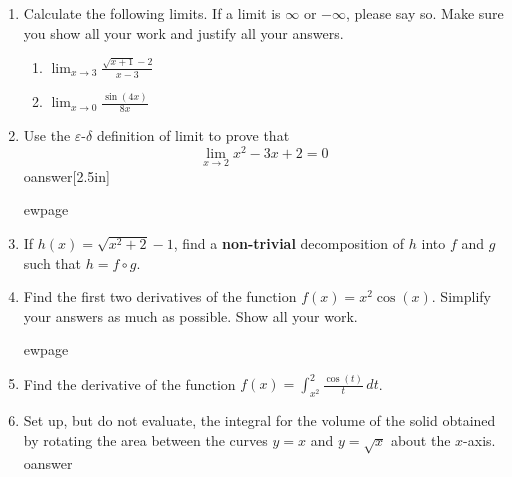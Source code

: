 \documentclass[fleqn]{article}
\let\ds\displaystyle
\begin{document}
\ExamNameLine
\begin{enumerate}
   \item Calculate the following limits.  If a limit is $\infty$ or $-\infty$,
      please say so.  Make sure you show all your work and justify all your
      answers.  
      \begin{enumerate}
	 \item $\ds{\lim_{x\rightarrow3}\frac{\sqrt{x+1} - 2}{x-3}}$\answer
	 \item $\ds{\lim_{x\rightarrow0}\frac{\sin(4x)}{8x}}$\answer
      \end{enumerate}
   \item Use the $\varepsilon$-$\delta$ definition of limit to prove that 
      \[\lim_{x\rightarrow 2} x^2 - 3x + 2 = 0\]
oanswer[2.5in]
      
ewpage
   \item If $h(x) = \sqrt{x^2 + 2} - 1$, find a \textbf{non-trivial} decomposition of $h$ into $f$ and $g$ such that $h = f\circ g$.
   \item Find the first two derivatives of the function $f(x) = x^2\cos(x)$.  Simplify
      your answers as much as possible.  Show all your work.
      
ewpage
   \item Find the derivative of the function $\ds{f(x) = \int_{x^2}^2
      \frac{\cos(t)}{t} \,dt}$.
   \item Set up, but do not evaluate, the integral for the volume of the solid obtained by rotating the area between the curves $y = x$ and $y = \sqrt{x}$ about the $x$-axis.
oanswer
\end{enumerate}
\end{document}
